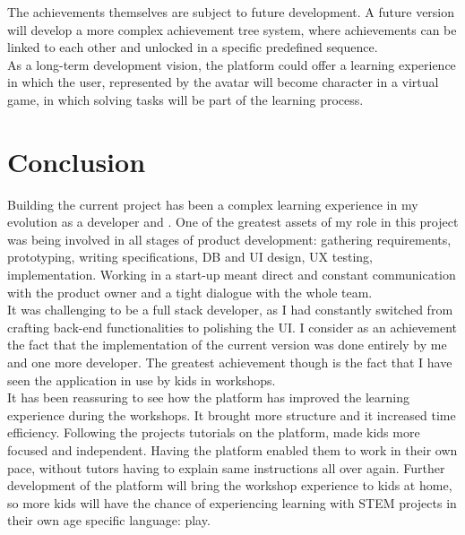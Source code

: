 The achievements themselves are subject to future development. A future version will develop a more complex achievement tree system, where achievements can be linked to each other and unlocked in a specific predefined sequence. \\

As a long-term development vision, the platform could offer a learning experience in which the user, represented by the avatar will become character in a virtual game, in which solving tasks will be part of the learning process. \\


\chapter{Conclusion}

Building the current project has been a complex learning experience in my evolution as a developer and . 
One of the greatest assets of my role in this project was being involved in all stages of product development: gathering requirements, prototyping, writing specifications, DB and UI design, UX testing, implementation. Working in a start-up meant direct and constant communication with the product owner and a tight dialogue with the whole team. \\

It was challenging to be a full stack developer, as I had constantly switched from crafting back-end functionalities to polishing the UI. I consider as an achievement the fact that the implementation of the current version was done entirely by me and one more developer. The greatest achievement though is the fact that I have seen the application in use by kids in workshops. \\

It has been reassuring to see how the platform has improved the learning experience during the workshops. It brought more structure and it increased time efficiency. Following the projects tutorials on the platform, made kids more focused and independent. Having the platform enabled them to work in their own pace, without tutors having to explain same instructions all over again. Further development of the platform will bring the workshop experience to kids at home, so more kids will have the chance of experiencing learning with STEM projects in their own age specific language: play.\\



